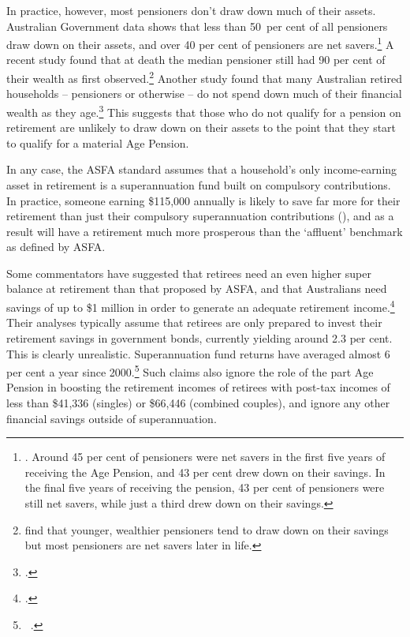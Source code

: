 In practice, however, most pensioners don’t draw down much of their assets. Australian Government data shows that less than 50~per cent of all pensioners draw down on their assets, and over 40 per cent of pensioners are net savers.\footnote{\textcite{Morrison2015TheBestFormOfWelfare}. Around 45 per cent of pensioners were net savers in the first five years of receiving the Age Pension, and 43 per cent drew down on their savings. In the final five years of receiving the pension, 43 per cent of pensioners were still net savers, while just a third drew down on their savings.}  
A recent study found that at death the median pensioner still had 90 per cent of their wealth as first observed.\footnote{\textcite{WuAsherMeyrickeEtAl2015} find that younger, wealthier pensioners tend to draw down on their savings but most pensioners are net savers later in life.} Another study found that many Australian retired households – pensioners or otherwise – do not spend down much of their financial wealth as they age.\footcite{SpicerStavrunovaThorp2015} This suggests that those who do not qualify for a pension on retirement are unlikely to draw down on their assets to the point that they start to qualify for a material Age Pension. 

In any case, the ASFA standard assumes that a household’s only income-earning asset in retirement is a superannuation fund built on compulsory contributions. In practice, someone earning \$115,000 annually is likely to save far more for their retirement than just their compulsory superannuation contributions (), and as a result will have a retirement much more prosperous than the ‘affluent’ benchmark as defined by ASFA. 

Some commentators have suggested that retirees need an even higher super balance at retirement than that proposed by ASFA, and that Australians need savings of up to \$1 million in order to generate an adequate retirement income.\footcite{Cooper2015}  Their analyses typically assume that retirees are only prepared to invest their retirement savings in government bonds, currently yielding around 2.3 per cent. This is clearly unrealistic. Superannuation fund returns have averaged almost 6 per cent a year since 2000.\footnote{\gao\ \textcite{APRA2015JuneSuperPerformance}.} 
Such claims also ignore the role of the part Age Pension in boosting the retirement incomes of retirees with post-tax incomes of less than \$41,336 (singles) or \$66,446 (combined couples), and ignore any other financial savings outside of superannuation. 

